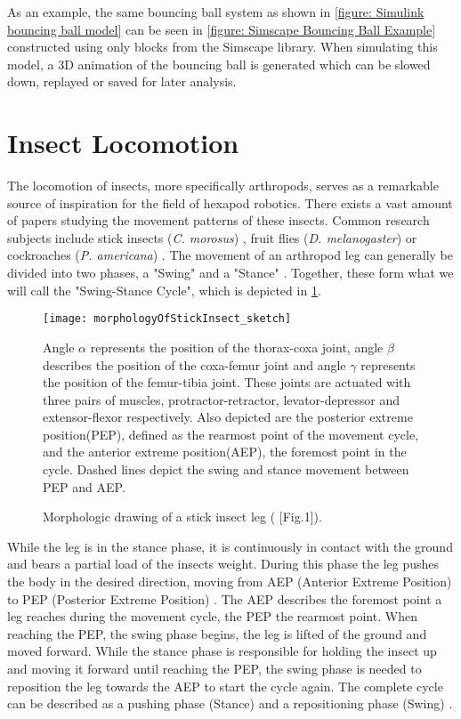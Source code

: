 As an example, the same bouncing ball system as shown in \ref{figure: Simulink bouncing ball model} can be seen in \ref{figure: Simscape Bouncing Ball Example} constructed using only blocks from the Simscape library. When simulating this model, a 3D animation of the bouncing ball is generated which can be slowed down, replayed or saved for later analysis.


\section{Insect Locomotion}
The locomotion of insects, more specifically arthropods, serves as a remarkable source of inspiration for the field of hexapod robotics.
There exists a vast amount of papers studying the movement patterns of these insects.
Common research subjects include stick insects (\textit{C. morosus}) \parencite{cruse1990mechanisms}, fruit flies (\textit{D. melanogaster}) \parencite{strauss1990coordination} or cockroaches (\textit{P. americana}) \parencite{delcomyn1971locomotion}. 
The movement of an arthropod leg can generally be divided into two phases, a "Swing" and a "Stance" \parencite{schilling2013walknet}.
Together, these form what we will call the "Swing-Stance Cycle", which is depicted in \ref{figure: Stick insect leg}.


\begin{figure}[h]
	\centerline{\texttt{[image: morphologyOfStickInsect\_sketch]}}
	\caption{Morphologic drawing of a stick insect leg (\cite{schilling2013walknet} [Fig.1]).}
	\begin{footnotesize}
		Angle $\alpha$ represents the position of the thorax-coxa joint, angle $\beta$ describes the position of the coxa-femur joint and angle $\gamma$ represents the position of the femur-tibia joint.
		These joints are actuated with three pairs of muscles, protractor-retractor, levator-depressor and extensor-flexor respectively.
		Also depicted are the posterior extreme position(PEP), defined as the rearmost point of the movement cycle, and the anterior extreme position(AEP), the foremost point in the cycle.
		Dashed lines depict the swing and stance movement between PEP and AEP.
	\end{footnotesize}
	
	\label{figure: Stick insect leg}
\end{figure}

While the leg is in the stance phase, it is continuously in contact with the ground and bears a partial load of the insects weight.
During this phase the leg pushes the body in the desired direction, moving from AEP (Anterior Extreme Position) to PEP (Posterior Extreme Position) \parencite{schilling2013walknet}.
The AEP describes the foremost point a leg reaches during the movement cycle, the PEP the rearmost point.
When reaching the PEP, the swing phase begins, the leg is lifted of the ground and moved forward.
While the stance phase is responsible for holding the insect up and moving it forward until reaching the PEP, the swing phase is needed to reposition the leg towards the AEP to start the cycle again\parencite{schilling2013walknet}.
The complete cycle can be described as a pushing phase (Stance) and a repositioning phase (Swing) .


